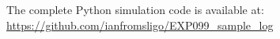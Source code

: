 The complete Python simulation code is available at:
\url{https://github.com/ianfromsligo/EXP099_sample_log}

